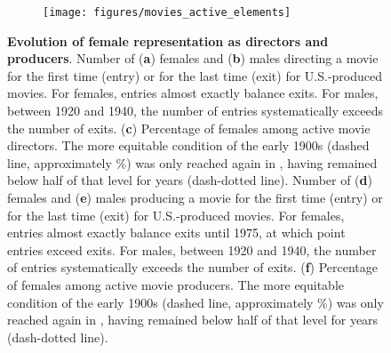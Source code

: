 \begin{figure}[t]
    \begin{subfigure}{0.99\textwidth}
        \texttt{[image: figures/movies\_active\_elements]}
        \label{fig:movies:active_elements_a}
    \end{subfigure}
    \begin{subfigure}{0\textwidth}
        \label{fig:movies:active_elements_b}
    \end{subfigure}
    \begin{subfigure}{0\textwidth}
        \label{fig:movies:active_elements_c}
    \end{subfigure}
    \begin{subfigure}{0\textwidth}
        \label{fig:movies:active_elements_d}
    \end{subfigure}
    \begin{subfigure}{0\textwidth}
        \label{fig:movies:active_elements_e}
    \end{subfigure}
    \begin{subfigure}{0\textwidth}
        \label{fig:movies:active_elements_f}
    \end{subfigure}
\caption[Evolution of female representation as directors and producers.]{\textbf{Evolution of female representation as directors and producers}. Number of (\textbf{a}) females and (\textbf{b}) males directing a movie for the first time (entry) or for the last time (exit) for U.S.-produced movies. For females, entries almost exactly balance exits. For males, between 1920 and 1940, the number of entries systematically exceeds the number of exits. (\textbf{c}) Percentage of females among active movie directors. The more equitable condition of the early 1900s (dashed line, approximately \activeDirEarlyMean{}\%) was only reached again in \activeDirYearRecover{}, having remained below half of that level for \activeDirYearsBelow{} years (dash-dotted line). Number of (\textbf{d}) females and (\textbf{e}) males producing a movie for the first time (entry) or for the last time (exit) for U.S.-produced movies. For females, entries almost exactly balance exits until 1975, at which point entries exceed exits. For males, between 1920 and 1940, the number of entries systematically exceeds the number of exits. (\textbf{f}) Percentage of females among active movie producers. The more equitable condition of the early 1900s (dashed line, approximately \activeProdEarlyMean{}\%) was only reached again in \activeProdYearRecover{}, having remained below half of that level for \activeProdYearsBelow{} years (dash-dotted line).}
\label{fig:movies:active_elements}
\end{figure}

